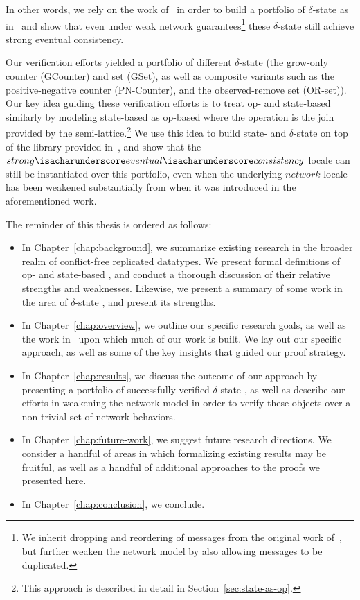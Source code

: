 In other words, we rely on the work of~\citep{gomes17} in order to build a
portfolio of $\delta$-state \CRDTs as in~\citep{almedia18} and show that even
under weak network guarantees\footnote{We inherit dropping and reordering of
messages from the original work of~\citep{gomes17}, but further weaken the
network model by also allowing messages to be duplicated.} these $\delta$-state
\CRDTs still achieve strong eventual consistency.

Our verification efforts yielded a portfolio of different $\delta$-state \CRDTs
(the grow-only counter (GCounter) and set (GSet), as well as composite variants
such as the positive-negative counter (PN-Counter), and the observed-remove set
(OR-set)). Our key idea guiding these verification efforts is to treat op- and
state-based \CRDTs similarly by modeling state-based \CRDTs as op-based where the
operation is the join provided by the semi-lattice.\footnote{This approach is
described in detail in Section~\ref{sec:state-as-op}.} We use this idea to
build state- and $\delta$-state \CRDTs on top of the library provided
in~\citep{gomes17}, and show that the
$strong{\isacharunderscore}eventual{\isacharunderscore}consistency$ locale can
still be instantiated over this portfolio, even when the underlying $network$
locale has been weakened substantially from when it was introduced in the
aforementioned work.

The reminder of this thesis is ordered as follows:
\begin{itemize}
  \item In Chapter~\ref{chap:background}, we summarize existing research in the
    broader realm of conflict-free replicated datatypes. We present formal
    definitions of op- and state-based \CRDTs, and conduct a thorough discussion
    of their relative strengths and weaknesses. Likewise, we present a summary
    of some work in the area of $\delta$-state \CRDTs, and present its strengths.
  \item In Chapter~\ref{chap:overview}, we outline our specific research goals,
    as well as the work in~\citep{almedia18} upon which much of our work is
    built. We lay out our specific approach, as well as some of the key insights
    that guided our proof strategy.
  \item In Chapter~\ref{chap:results}, we discuss the outcome of our approach by
    presenting a portfolio of successfully-verified $\delta$-state \CRDTs, as
    well as describe our efforts in weakening the network model in order to
    verify these objects over a non-trivial set of network behaviors.
  \item In Chapter~\ref{chap:future-work}, we suggest future
    research directions. We consider a handful of areas in which formalizing
    existing results may be fruitful, as well as a handful of additional
    approaches to the proofs we presented here.
  \item In Chapter~\ref{chap:conclusion}, we conclude.
\end{itemize}
